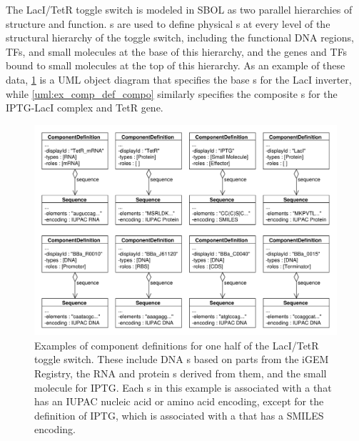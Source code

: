 The LacI/TetR toggle switch is modeled in SBOL as two parallel hierarchies of structure and function. s are used to define physical s at every level of the structural hierarchy of the toggle switch, including the functional DNA regions, TFs, and small molecules at the base of this hierarchy, and the genes and TFs bound to small molecules at the top of this hierarchy. As an example of these data, \ref{uml:ex_comp_defs} is a UML object diagram that specifies the base s for the LacI inverter, while \ref{uml:ex_comp_def_compo} similarly specifies the composite s for the IPTG-LacI complex and TetR gene. 

\begin{figure}[ht]
\begin{center}
\includegraphics[width=\textwidth]{example_uml/toggle_1}
\caption[]{Examples of component definitions for one half of the LacI/TetR toggle switch. These include DNA s based on parts from the iGEM Registry, the RNA and protein s derived from them, and the small molecule  for IPTG. Each s in this example is associated with a  that has an IUPAC nucleic acid or amino acid encoding, except for the definition of IPTG, which is associated with a  that has a SMILES encoding.}
\label{uml:ex_comp_defs}
\end{center}
\end{figure}

